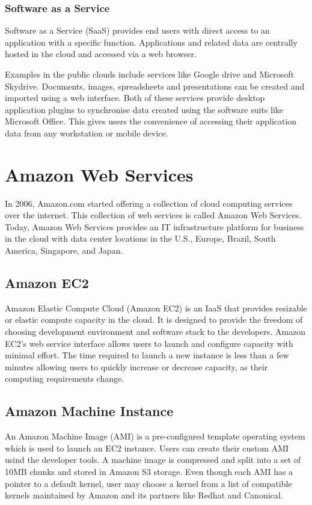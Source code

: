 \documentclass[12pt,a4paper]{report}
\begin{document}
\subsubsection{Software as a Service}

Software as a Service (SaaS) provides end users with direct access to an application with a specific function. 
Applications and related data are centrally hosted in the cloud and accessed via a web browser.

Examples in the public clouds include services like Google drive\cite{} and Microsoft Skydrive\cite{}.
Documents, images, spreadsheets and presentations can be created and imported using a web interface. 
Both of these services provide desktop application plugins to synchronise data created using the software suits like Microsoft Office. 
This gives users the convenience of accessing their application data from any workstation or mobile device.

\section{Amazon Web Services}  
In 2006, Amazon.com\cite{} started offering a collection of cloud computing services over the internet. This collection of web services is called Amazon Web Services. Today, Amazon Web Services provides an IT infrastructure platform for business in the cloud with data center locations in the U.S., Europe, Brazil, South America, Singapore, and Japan.

\subsection{Amazon EC2}  
Amazon Elastic Compute Cloud (Amazon EC2) is an IaaS that provides resizable or elastic compute capacity in the cloud. It is designed to provide the freedom of choosing development environment and software stack to the developers. 
Amazon EC2’s web service interface allows users to launch and configure capacity with minimal effort. The time required to launch a new instance is less than a few minutes allowing users to quickly increase or decrease capacity, as their computing requirements change.

\subsection{Amazon Machine Instance}
An Amazon Machine Image (AMI) is a pre-configured template operating system which is used to launch an EC2 instance. Users can create their custom AMI usind the developer tools. 
A machine image is compressed and split into a set of 10MB chunks and stored in Amazon S3 storage. Even though each AMI has a pointer to a default kernel, user may choose a kernel from a list of compatible kernels maintained by Amazon and its partners like Redhat and Canonical. 
\end{document}
